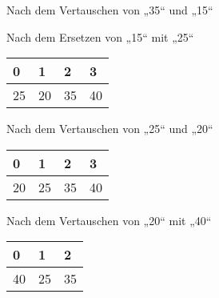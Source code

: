 \documentclass{bschlangaul-aufgabe}
\begin{document}
\begin{enumerate}
\begin{bAntwort}
\begin{bBaum}{Nach dem Vertauschen von „35“ und „15“}
\end{bBaum}

%


\begin{bBaum}{Nach dem Ersetzen von „15“ mit „25“}
\begin{tabular}{llll}
\bf{0} & \bf{1} & \bf{2} & \bf{3} \\
\hline
25     & 20     & 35     & 40     \\
\end{tabular}

\end{bBaum}

\begin{bBaum}{Nach dem Vertauschen von „25“ und „20“}
\begin{tabular}{llll}
\bf{0} & \bf{1} & \bf{2} & \bf{3} \\
\hline
20     & 25     & 35     & 40     \\
\end{tabular}

\end{bBaum}

%


\begin{bBaum}{Nach dem Vertauschen von „20“ mit „40“}
\begin{tabular}{lll}
\bf{0} & \bf{1} & \bf{2} \\
\hline
40     & 25     & 35     \\
\end{tabular}


\end{bBaum}
\end{bAntwort}
\end{enumerate}
\end{document}

